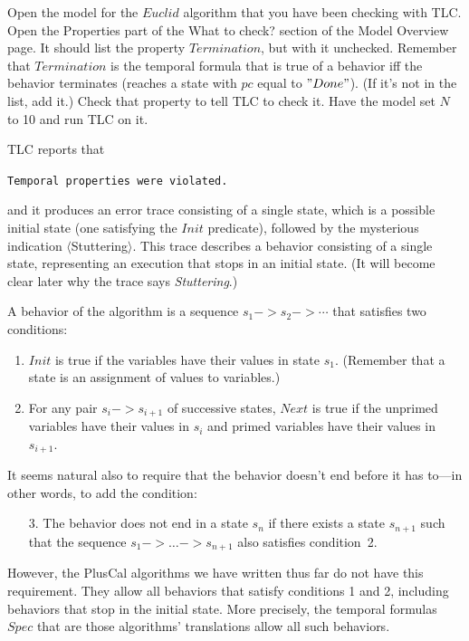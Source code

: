 \documentclass[fleqn,leqno]{article}
\begin{document}
Open the model for the $Euclid$ algorithm that you have been checking
with TLC. Open the \textsf{Properties} part of the \textsf{What to
check?} section of the \textsf{Model Overview} page.  It should list
the property $Termination$, but with it unchecked.  Remember that
$Termination$ is the temporal formula that is true of a behavior iff
the behavior terminates (reaches a state with $pc$ equal to $"Done"$).
(If it's not in the list, add it.)  Check that property to tell TLC to
check it.  Have the model set $N$ to 10 and run TLC on it.

TLC reports that
\begin{display}
\tt Temporal properties were violated.
\end{display}
and it produces an error trace consisting of a single state, which is a
possible initial state (one satisfying the $Init$ predicate), followed
by the mysterious indication $\langle$\textsf{Stuttering}$\rangle$.
This trace describes a behavior consisting of a single state,
representing an execution that stops in an initial state.  (It will
become clear later why the trace says \emph{Stuttering}.)

A behavior of the algorithm is a sequence $s_{1}-> s_{2}-> \cdots$
that satisfies two conditions:
\begin{enumerate}
\item $Init$ is true if the variables have their values in state $s_{1}$.
(Remember that a state is an assignment of values to variables.)

\item For any pair $s_{i}->s_{i+1}$ of successive states, $Next$ is
true if the unprimed variables have their values in $s_{i}$ and
primed variables have their values in $s_{i+1}$.  
\end{enumerate}
It seems natural also to require that the behavior doesn't end before
it has to---in other words, to add the condition:
\begin{enumerate}
\item[3.] The behavior does not end in a state $s_{n}$ if there exists
a state $s_{n+1}$ such that the sequence $s_{1}->\ldots->s_{n+1}$ also
satisfies condition~2.
\end{enumerate}
However, the PlusCal algorithms we have written thus far do not have
this requirement.  They allow all behaviors that satisfy conditions 1
and 2, including behaviors that stop in the initial state.  More
precisely, the temporal formulas $Spec$ that are those algorithms'
translations allow all such behaviors.
\end{document}
